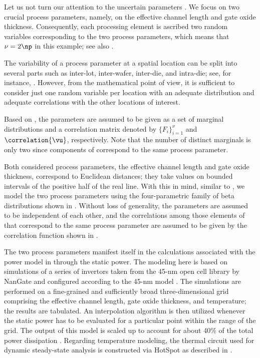 Let us not turn our attention to the uncertain parameters \vu. We focus on two
crucial process parameters, namely, on the effective channel length and
gate oxide thickness. Consequently, each processing element is ascribed two
random variables corresponding to the two process parameters, which means that
$\nu = 2 \np$ in this example; see also .

\begin{remark}
The variability of a process parameter at a spatial location can be split into
several parts such as inter-lot, inter-wafer, inter-die, and intra-die; see, for
instance, \cite{juan2012}. However, from the mathematical point of view, it is
sufficient to consider just one random variable per location with an adequate
distribution and adequate correlations with the other locations of interest.
\end{remark}

Based on , the parameters \vu are assumed to be given as
a set of marginal distributions and a correlation matrix denoted by $\{ F_i
\}_{i = 1}^\nu$ and $\correlation{\vu}$, respectively. Note that the number of
distinct marginals is only two since \np components of \vu correspond to the
same process parameter.

Both considered process parameters, the effective channel length and gate oxide
thickness, correspond to Euclidean distances; they take values on bounded
intervals of the positive half of the real line. With this in mind, similar to
, we model the two process parameters using
the four-parametric family of beta distributions shown in
. Without loss of generality, the parameters are assumed
to be independent of each other, and the correlations among those elements of
\vu that correspond to the same process parameter are assumed to be given by the
correlation function shown in .

The two process parameters manifest itself in the calculations associated with
the power model in  through the static power. The
modeling here is based on  simulations of a series of 
invertors taken from the 45-nm open cell library by NanGate \cite{nangate} and
configured according to the 45-nm   model \cite{ptm}. The
simulations are performed on a fine-grained and sufficiently broad
three-dimensional grid comprising the effective channel length, gate oxide
thickness, and temperature; the results are tabulated. An interpolation
algorithm is then utilized whenever the static power has to be evaluated for a
particular point within the range of the grid. The output of this model is
scaled up to account for about 40\% of the total power dissipation
\cite{liu2007}. Regarding temperature modeling, the thermal  circuit used
for dynamic steady-state analysis is constructed via HotSpot \cite{skadron2003}
as described in .

